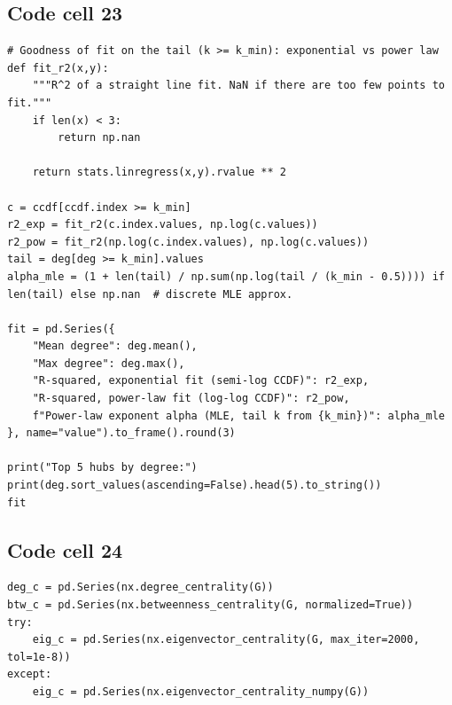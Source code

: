 \documentclass[12pt,a4paper]{report}
\begin{document}
\subsection*{Code cell 23}
\begin{lstlisting}[style=fancy]
# Goodness of fit on the tail (k >= k_min): exponential vs power law 
def fit_r2(x,y):
    """R^2 of a straight line fit. NaN if there are too few points to fit."""
    if len(x) < 3:
        return np.nan
    
    return stats.linregress(x,y).rvalue ** 2

c = ccdf[ccdf.index >= k_min]
r2_exp = fit_r2(c.index.values, np.log(c.values))
r2_pow = fit_r2(np.log(c.index.values), np.log(c.values))
tail = deg[deg >= k_min].values
alpha_mle = (1 + len(tail) / np.sum(np.log(tail / (k_min - 0.5)))) if len(tail) else np.nan  # discrete MLE approx.

fit = pd.Series({
    "Mean degree": deg.mean(),
    "Max degree": deg.max(),
    "R-squared, exponential fit (semi-log CCDF)": r2_exp,
    "R-squared, power-law fit (log-log CCDF)": r2_pow,
    f"Power-law exponent alpha (MLE, tail k from {k_min})": alpha_mle
}, name="value").to_frame().round(3)

print("Top 5 hubs by degree:")
print(deg.sort_values(ascending=False).head(5).to_string())
fit
\end{lstlisting}

\subsection*{Code cell 24}
\begin{lstlisting}[style=fancy]
deg_c = pd.Series(nx.degree_centrality(G))
btw_c = pd.Series(nx.betweenness_centrality(G, normalized=True))
try:
    eig_c = pd.Series(nx.eigenvector_centrality(G, max_iter=2000, tol=1e-8))
except:
    eig_c = pd.Series(nx.eigenvector_centrality_numpy(G))
\end{lstlisting}
\end{document}
